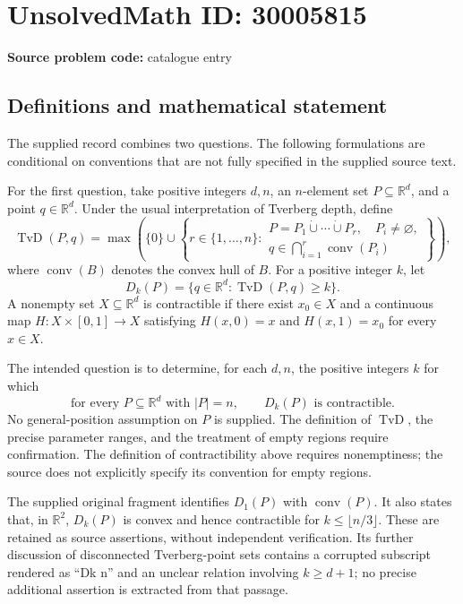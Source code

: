 \documentclass[11pt]{article}
\newcommand{\R}{\mathbb{R}}
\begin{document}
\section*{UnsolvedMath ID: 30005815}
\textbf{Source problem code:} catalogue entry
\subsection{Definitions and mathematical statement}
The supplied record combines two questions. The following formulations are conditional on conventions that are not fully specified in the supplied source text.

For the first question, take positive integers \(d,n\), an \(n\)-element set \(P\subseteq\R^d\), and a point \(q\in\R^d\). Under the usual interpretation of Tverberg depth, define
\[
\operatorname{TvD}(P,q)=\max\left(\{0\}\cup\left\{r\in\{1,\ldots,n\}:\begin{array}{l}
P=P_1\mathbin{\dot\cup}\cdots\mathbin{\dot\cup}P_r,\quad P_i\ne\varnothing,\\
q\in\displaystyle\bigcap_{i=1}^r\operatorname{conv}(P_i)
\end{array}\right\}\right),
\]
where \(\operatorname{conv}(B)\) denotes the convex hull of \(B\). For a positive integer \(k\), let
\[
D_k(P)=\{q\in\R^d:\operatorname{TvD}(P,q)\ge k\}.
\]
A nonempty set \(X\subseteq\R^d\) is contractible if there exist \(x_0\in X\) and a continuous map \(H:X\times[0,1]\to X\) satisfying \(H(x,0)=x\) and \(H(x,1)=x_0\) for every \(x\in X\).

The intended question is to determine, for each \(d,n\), the positive integers \(k\) for which
\[
\text{for every }P\subseteq\R^d\text{ with }|P|=n,\qquad D_k(P)\text{ is contractible}.
\]
No general-position assumption on \(P\) is supplied. The definition of \(\operatorname{TvD}\), the precise parameter ranges, and the treatment of empty regions require confirmation. The definition of contractibility above requires nonemptiness; the source does not explicitly specify its convention for empty regions.

The supplied original fragment identifies \(D_1(P)\) with \(\operatorname{conv}(P)\). It also states that, in \(\R^2\), \(D_k(P)\) is convex and hence contractible for \(k\le\lfloor n/3\rfloor\). These are retained as source assertions, without independent verification. Its further discussion of disconnected Tverberg-point sets contains a corrupted subscript rendered as ``Dk n'' and an unclear relation involving \(k\ge d+1\); no precise additional assertion is extracted from that passage.
\end{document}
